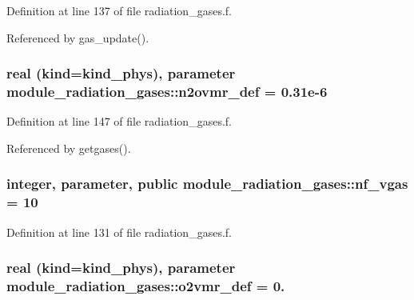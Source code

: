 Definition at line 137 of file radiation\+\_\+gases.\+f.



Referenced by gas\+\_\+update().

\subsubsection[{\texorpdfstring{n2ovmr\+\_\+def}{n2ovmr_def}}]{\setlength{\rightskip}{0pt plus 5cm}real (kind=kind\+\_\+phys), parameter module\+\_\+radiation\+\_\+gases\+::n2ovmr\+\_\+def = 0.\+31e-\/6\hspace{0.3cm}{\ttfamily [private]}}\hypertarget{namespacemodule__radiation__gases_a858ad802efe755f8b4b5bde85996b6ae}{}\label{namespacemodule__radiation__gases_a858ad802efe755f8b4b5bde85996b6ae}


Definition at line 147 of file radiation\+\_\+gases.\+f.



Referenced by getgases().

\subsubsection[{\texorpdfstring{nf\+\_\+vgas}{nf_vgas}}]{\setlength{\rightskip}{0pt plus 5cm}integer, parameter, public module\+\_\+radiation\+\_\+gases\+::nf\+\_\+vgas = 10}\hypertarget{namespacemodule__radiation__gases_affc350828412da77ff3cf3e617ddc66c}{}\label{namespacemodule__radiation__gases_affc350828412da77ff3cf3e617ddc66c}


Definition at line 131 of file radiation\+\_\+gases.\+f.

\subsubsection[{\texorpdfstring{o2vmr\+\_\+def}{o2vmr_def}}]{\setlength{\rightskip}{0pt plus 5cm}real (kind=kind\+\_\+phys), parameter module\+\_\+radiation\+\_\+gases\+::o2vmr\+\_\+def = 0.\hspace{0.3cm}{\ttfamily [private]}}\hypertarget{namespacemodule__radiation__gases_a910898e96b8afe92ebc82ce62ba682d8}{}\label{namespacemodule__radiation__gases_a910898e96b8afe92ebc82ce62ba682d8}



